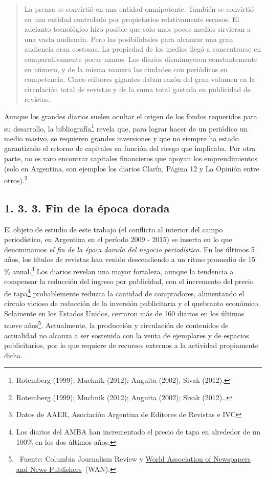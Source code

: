 \begin{quote}
La prensa se convirtió en una entidad omnipotente. También se convirtió en una entidad controlada por propietarios relativamente escasos. El adelanto tecnológico hizo posible que solo unos pocos medios sirvieran a una vasta audiencia. Pero las posibilidades para alcanzar una gran audiencia eran costosas. La propiedad de los medios llegó a concentrarse en comparativamente pocas manos. Los diarios disminuyeron constantemente en número, y de la misma manera las ciudades con periódicos en competencia. Cinco editores gigantes daban razón del gran volumen en la circulación total de revistas y de la suma total gastada en publicidad de revistas.
\end{quote}

Aunque los grandes diarios suelen ocultar el origen de los fondos requeridos para su desarrollo, la bibliografía\footnote{Rotemberg (1999); Muchnik (2012); Anguita (2002); Sivak (2012).} revela que, para lograr hacer de un periódico un medio masivo, se requieren grandes inversiones y que no siempre ha estado garantizado el retorno de capitales en función del riesgo que implicaba. Por otra parte, no es raro encontrar capitales financieros que apoyan los emprendimientos (solo en Argentina, son ejemplos los diarios Clarín, Página 12 y La Opinión entre otros).\footnote{Rotemberg (1999); Muchnik (2012); Anguita (2002); Sivak (2012)..}


\subsection{1. 3. 3. Fin de la época dorada}

El objeto de estudio de este trabajo (el conflicto al interior del campo periodístico, en Argentina en el período 2009 - 2015) se inserta en lo que denominamos \emph{el fin de la época dorada del negocio periodístico}. En los últimos 5 años, los títulos de revistas han venido descendiendo a un ritmo promedio de 15 \% anual.\footnote{Datos de AAER, Asociación Argentina de Editores de Revistas e IVC} Los diarios revelan una mayor fortaleza, aunque la tendencia a compensar la reducción del ingreso por publicidad, con el incremento del precio de tapa\footnote{Los diarios del AMBA han incrementado el precio de tapa en alrededor de un 100\% en los dos últimos años.} probablemente reduzca la cantidad de compradores, alimentando el círculo vicioso de reducción de la inversión publicitaria y el quebranto económico. Solamente en los Estados Unidos, cerraron más de 160 diarios en los últimos nueve años\footnote{~Fuente: Columbia Journalism Review y \href{http://www.wan-ifra.org/}{World Association of Newspapers and News Publishers}~(WAN).}. Actualmente, la producción y circulación de contenidos de actualidad no alcanza a ser sostenida con la venta de ejemplares y de espacios publicitarios, por lo que requiere de recursos externos a la actividad propiamente dicha.

